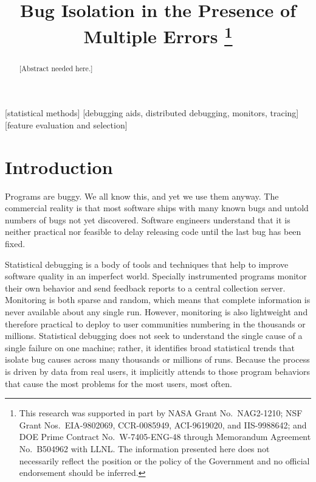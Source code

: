\documentclass{sig-alternate}
\title{Bug Isolation in the Presence of Multiple Errors
  \thanks{This research was supported in part by NASA Grant No.\ 
    NAG2-1210; NSF Grant Nos.\ EIA-9802069, CCR-0085949, ACI-9619020,
    and IIS-9988642; and DOE Prime Contract No.\ W-7405-ENG-48 through
    Memorandum Agreement No.\ B504962 with LLNL.  The information
    presented here does not necessarily reflect the position or the
    policy of the Government and no official endorsement should be
    inferred.}}
\author{
  \alignauthor Ben Liblit \eecs \\
  \alignauthor Mayur Naik \stan \\
  \alignauthor Alice X.\ Zheng \eecs \\
  \moreauthors
  \global\multiply\auwidth by 3
  \global\divide\auwidth by 2
  \alignauthor Alex Aiken \stan \\
  \alignauthor Michael I.\ Jordan \both
  \moreauthors
  \alignauthor
  \affaddr{\eecs Department of Electrical \\ Engineering and Computer Science} \\
  \affaddr{\stat Department of Statistics} \\
  \affaddr{University of California, Berkeley} \\
  \affaddr{Berkeley, CA 94720-1776}
  \alignauthor
  \affaddr{\stan Computer Science Department} \\
  \affaddr{353 Serra Mall} \\
  \affaddr{Stanford University} \\
  \affaddr{Stanford CA 94305-9025}
}
\newcommand{\placeholder}[1]{{\color[cmyk]{0,0.61,0.87,0}[#1]}}
\begin{document}
\CopyrightYear{2004}
\maketitle

\begin{abstract}
\placeholder{Abstract needed here.}
\end{abstract}

[statistical methods]
[debugging aids, distributed debugging, monitors, tracing]
[feature
  evaluation and selection]




\section{Introduction}
\label{sec:introduction}

Programs are buggy.  We all know this, and yet we use them anyway.
The commercial reality is that most software ships with many known
bugs and untold numbers of bugs not yet discovered.  Software
engineers understand that it is neither practical nor feasible to
delay releasing code until the last bug has been fixed.

Statistical debugging is a body of tools and techniques that help to
improve software quality in an imperfect world.  Specially
instrumented programs monitor their own behavior and send feedback
reports to a central collection server.  Monitoring is both sparse and
random, which means that complete information is never available about
any single run.  However, monitoring is also lightweight and therefore
practical to deploy to user communities numbering in the thousands or
millions.  Statistical debugging does not seek to understand the
single cause of a single failure on one machine; rather, it identifies
broad statistical trends that isolate bug causes across many thousands
or millions of runs.  Because the process is driven by data from real
users, it implicitly attends to those program behaviors that cause the
most problems for the most users, most often.
\end{document}
